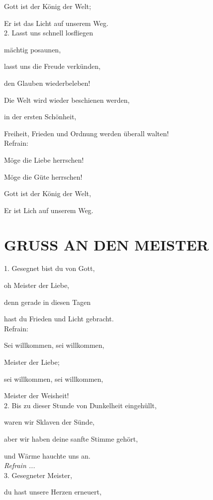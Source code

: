 \documentclass[11pt,a5paper,twoside]{article}
\begin{document}
Gott ist der König der Welt; 

Er ist das Licht auf unserem Weg.\\

2. Lasst uns schnell losfliegen 

mächtig posaunen, 

lasst uns die Freude verkünden,

den Glauben wiederbeleben! 

Die Welt wird wieder beschienen werden, 

in der ersten Schönheit, 

Freiheit, Frieden und Ordnung werden überall walten!\\

Refrain: 

Möge die Liebe herrschen!

Möge die Güte herrschen!

Gott ist der König der Welt,

Er ist Lich auf unserem Weg.

\section[Gruß an den Meister]{GRUSS AN DEN MEISTER}

1. Gesegnet bist du von Gott, 

oh Meister der Liebe, 

denn gerade in diesen Tagen

hast du Frieden und Licht gebracht.\\

Refrain: 

Sei willkommen, sei willkommen,

Meister der Liebe; 

sei willkommen, sei willkommen, 

Meister der Weisheit!\\


2. Bis zu dieser Stunde von Dunkelheit eingehüllt, 

waren wir Sklaven der Sünde,

aber wir haben deine sanfte Stimme gehört, 

und Wärme hauchte uns an.\\

\textit{Refrain ...}\\

3. Gesegneter Meister,

du hast unsere Herzen erneuert, 
 
\end{document}
